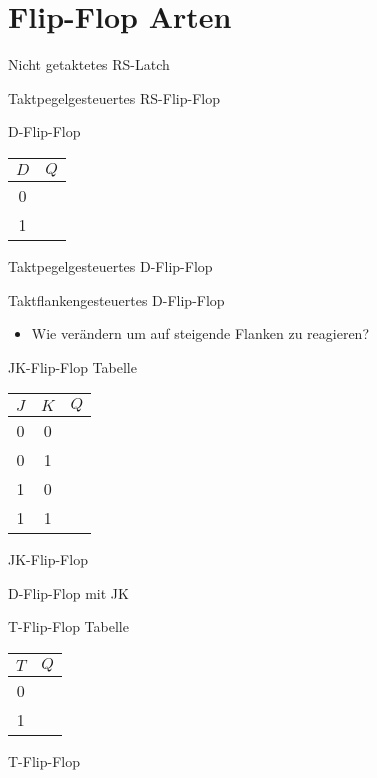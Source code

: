 \documentclass[
  german,            %
  aspectratio=169,    %
  sectionpage=false,   %
]{tumbeamer}
\begin{document}
\section{Flip-Flop Arten}
\begin{frame}{Nicht getaktetes RS-Latch}
\end{frame}
\begin{frame}{Taktpegelgesteuertes RS-Flip-Flop}
\end{frame}
\begin{frame}{D-Flip-Flop}
		\centering
	\begin{tabular}[t]{c|c}
		\(D\)  & \(Q\) \\
		\hline
		0         & \\
		1         & \\
	\end{tabular}
\end{frame}
\begin{frame}{Taktpegelgesteuertes D-Flip-Flop}
\end{frame}
\begin{frame}{Taktflankengesteuertes D-Flip-Flop}
	\begin{itemize}
		\item Wie verändern um auf steigende Flanken zu reagieren?
	\end{itemize}
\end{frame}
\begin{frame}{JK-Flip-Flop Tabelle}
	\centering
	\begin{tabular}[t]{cc|c}
		\(J\)    & \(K\) & \(Q\) \\
		\hline
		0         & 0     &  \\
		0        & 1     & \\
		1        & 0     & \\
		1         & 1     &  \\
	\end{tabular}
\end{frame}
\begin{frame}{JK-Flip-Flop}
\end{frame}
\begin{frame}{D-Flip-Flop mit JK}
\end{frame}
\begin{frame}{T-Flip-Flop Tabelle}
	\centering
	\begin{tabular}[t]{c|c}
		\(T\)  & \(Q\) \\
		\hline
		0         & \\
		1         & \\
	\end{tabular}
\end{frame}
\begin{frame}{T-Flip-Flop}
\end{frame}
\end{document}

